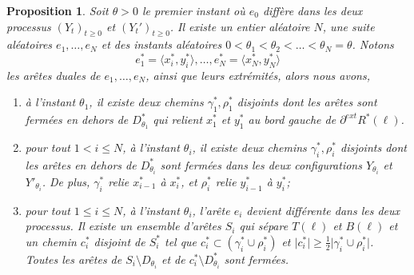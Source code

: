 \documentclass[titlepage,a4paper,12pt]{article}
\newcounter{prop}
\newtheorem{chaine}[prop]{Proposition}
\begin{document}
\begin{chaine}
\label{chaine}
Soit $\theta>0$ le premier instant où $e_0$ diffère dans les deux processus $(Y_t)_{t\geqslant 0}$ et $(Y_t')_{t\geqslant 0}$. Il existe un entier aléatoire $N$, une suite aléatoires $e_1,\dots,e_N$ et des instants aléatoires $0<\theta_1< \theta_2<\dots<\theta_N=\theta$. 
Notons $$ e_1^*=\langle x_i^*,y_i^*\rangle, \dots,e_N^*=\langle x_N^*,y_N^*\rangle
$$ les arêtes duales de $e_1,\dots,e_N$, ainsi que leurs extrémités, alors nous avons,
\begin{enumerate}[leftmargin =*]
\item à l'instant $\theta_1$, il existe deux chemins $\gamma_1^*,\rho_1^*$ disjoints dont les arêtes sont fermées en dehors de $D_{\theta_1}^*$ qui relient $x_1^*$ et $y_1^*$ au bord gauche de $\partial^{ext}R^*(\ell)$.

\item pour tout $1<i\leqslant N$, à l'instant $\theta_i$, il existe deux chemins $\gamma_i^*,\rho_i^*$ disjoints dont les arêtes en dehors de $D_{\theta_i}^*$ sont fermées dans les deux configurations $Y_{\theta_i}$ et $Y'_{\theta_i}$. De plus, $\gamma_i^*$ relie $x_{i-1}^*$ à $x_i^*$, et $\rho_i^*$ relie  $y_{i-1}^*$ à $y_i^*$;

\item pour tout $1\leqslant i \leqslant N$, à l'instant $\theta_i$, l'arête $e_i$ devient différente dans les deux processus. Il existe un ensemble d'arêtes $S_i$ qui sépare $T(\ell)$ et $B(\ell)$ et un chemin $c^*_i$ disjoint de $S^*_i$ tel que $c_i^* \subset (\gamma_i^*\cup \rho_i^*)$ et $\vert c_i^*\vert \geqslant \frac{1}{2} \vert \gamma_i^*\cup \rho_i^* \vert$. Toutes les arêtes de $S_i\setminus D_{\theta_i}$ et de  $c^*_i\setminus D_{\theta_i}^*$ sont fermées.
\end{enumerate}

\end{chaine}
\end{document}

